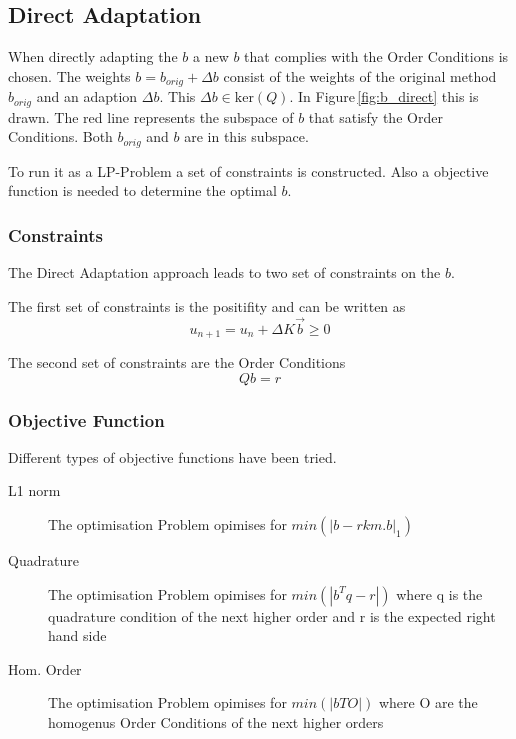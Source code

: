 \documentclass{article}
\begin{document}
\subsection{Direct Adaptation}\label{sec:direct}

When directly adapting the $b$ a new $b$ that complies with the Order Conditions is chosen.   
The weights $b = b_{orig} + \Delta b$ consist of the weights of the original method $b_{orig}$ and an adaption $\Delta b$. This $\Delta b \in \mathrm{ker}(Q)$. 
In Figure\,\ref{fig:b_direct} this is drawn. The red line represents the subspace of $b$ that satisfy the Order Conditions. Both $b_{orig}$ and $b$ are in this subspace. 
 
To run it as a LP-Problem a set of constraints is constructed.  
Also a objective function is needed to determine the optimal $b$.

\subsubsection{Constraints}
The Direct Adaptation approach leads to two set of constraints on the $b$.

The first set of constraints is the positifity and can be written as 
$$u_{n+1}=u_n+\Delta K \vec{b} \geq 0$$

The second set of constraints are the Order Conditions
$$Qb=r$$



\subsubsection{Objective Function}
Different types of objective functions have been tried. 

\begin{description}

\item[L1 norm] The optimisation Problem opimises for $min(|b-rkm.b|_1)$
            
\item[Quadrature]   The optimisation Problem opimises for $min(|b^Tq-r|)$
                            where q is the quadrature condition of the next higher order 
                            and r is the expected right hand side
            
\item[Hom. Order]    The optimisation Problem opimises for $min(|bTO|)$ where O are the homogenus Order Conditions of the next higher orders
                            
 
\end{description}
\end{document}
